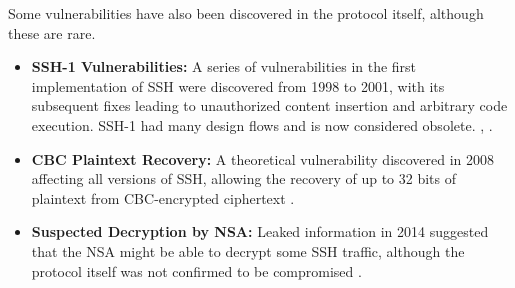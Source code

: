     Some vulnerabilities have also been discovered in the protocol itself, although these are rare.
    \begin{itemize}
        \item \textbf{SSH-1 Vulnerabilities:} A series of vulnerabilities in the first implementation of SSH were discovered from 1998 to 2001, with its subsequent fixes leading to unauthorized content insertion and arbitrary code execution. SSH-1 had many design flows and is now considered obsolete. \cite{CoreSecurity23}, \cite{SSH1Vulnerability01}. 
        \item \textbf{CBC Plaintext Recovery:} A theoretical vulnerability discovered in 2008 affecting all versions of SSH, allowing the recovery of up to 32 bits of plaintext from CBC-encrypted ciphertext \cite{USCERT2011}.
        \item \textbf{Suspected Decryption by NSA:} Leaked information in 2014 suggested that the NSA might be able to decrypt some SSH traffic, although the protocol itself was not confirmed to be compromised \cite{Spiegel14}.
    \end{itemize}
    
